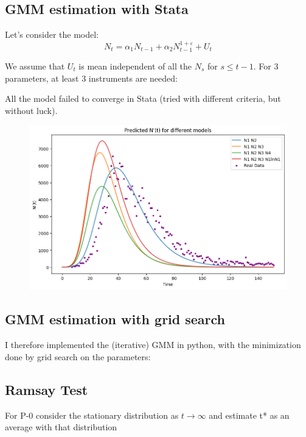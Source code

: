     


    \subsection{GMM estimation with Stata}

    Let's consider the model:
    \begin{equation}
        N_{t} = \alpha_1 N_{t-1} + \alpha_2 N_{t-1}^{1 + \varepsilon} + U_t\label{eq:equation1}
    \end{equation}

    We assume that $U_t$ is mean independent of all the $N_s$ for $s\leq t-1$. For 3 parameters, at least 3 instruments are needed:

    

    All the model failed to converge in Stata (tried with different criteria, but without luck).

    \begin{figure}
        \centering
        \includegraphics{plots/gmm_stata}
    \end{figure}

    \subsection{GMM estimation with grid search}

    I therefore implemented the (iterative) GMM in python, with the minimization done by grid search on the parameters:


    \subsection{Ramsay Test}





For P-0 consider the stationary distribution as $t \to \infty $ and estimate t* as an average with that distribution
